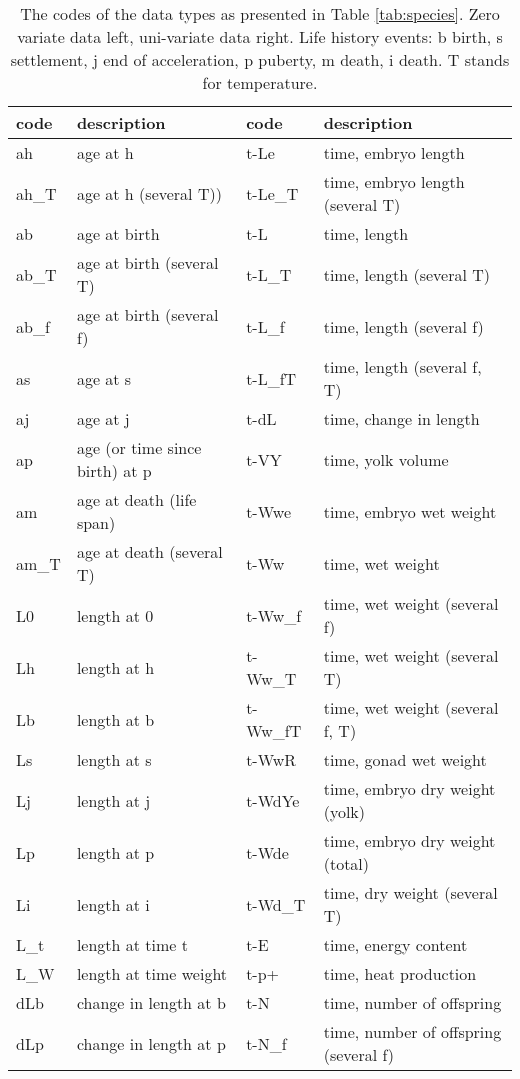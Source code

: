 \begin{table}\small
\caption{\label{tab:codes}\protect\small
The codes of the data types as presented in Table \ref{tab:species}.
Zero variate data left, uni-variate data right.
Life history events: b birth, s settlement, j end of acceleration, p puberty, m death, i death.
T stands for temperature.}

\begin{tabular}{ll|ll} \hline
\textbf{code} & \textbf{description} & \textbf{code} & \textbf{description}\\ \hline
ah & age at h & t-Le & time, embryo length\\ 
ah\_T & age at h (several T)) & t-Le\_T & time, embryo length (several T)\\ 
ab & age at birth & t-L & time, length\\ 
ab\_T & age at birth (several T) & t-L\_T & time, length (several T)\\ 
ab\_f & age at birth (several f) & t-L\_f & time, length (several f)\\ 
as & age at s & t-L\_fT & time, length (several f, T)\\ 
aj & age at j & t-dL & time, change in length\\ 
ap & age (or time since birth) at p & t-VY & time, yolk volume\\ 
am & age at death (life span) & t-Wwe & time, embryo wet weight\\ 
am\_T & age at death (several T) & t-Ww & time, wet weight\\ 
L0 & length at 0 & t-Ww\_f & time, wet weight (several f)\\ 
Lh & length at h & t-Ww\_T & time, wet weight (several T)\\ 
Lb & length at b & t-Ww\_fT & time, wet weight (several f, T)\\ 
Ls & length at s & t-WwR & time, gonad wet weight\\ 
Lj & length at j & t-WdYe & time, embryo dry weight (yolk)\\ 
Lp & length at p & t-Wde & time, embryo dry weight (total)\\ 
Li & length at i & t-Wd\_T & time, dry weight (several T)\\ 
L\_t & length at time t & t-E & time, energy content\\ 
L\_W & length at time weight & t-p+ & time, heat production\\ 
dLb & change in length at b & t-N & time, number of offspring\\ 
dLp & change in length at p & t-N\_f & time, number of offspring (several f)\\ 

\end{tabular}
\end{table}
